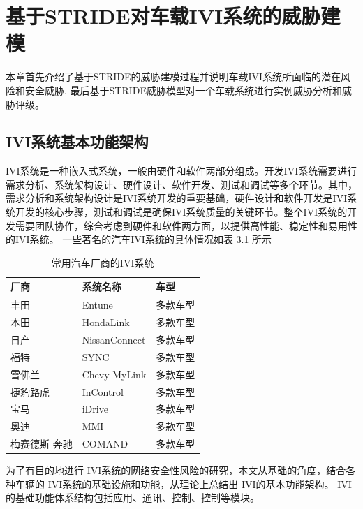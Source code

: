 \chapter{基于STRIDE对车载IVI系统的威胁建模}
\label{ch3}
本章首先介绍了基于STRIDE的威胁建模过程并说明车载IVI系统所面临的潜在风险和安全威胁, 最后基于STRIDE威胁模型对一个车载系统进行实例威胁分析和威胁评级。

\section{IVI系统基本功能架构}
IVI系统是一种嵌入式系统，一般由硬件和软件两部分组成。开发IVI系统需要进行需求分析、系统架构设计、硬件设计、软件开发、测试和调试等多个环节。其中，需求分析和系统架构设计是IVI系统开发的重要基础，硬件设计和软件开发是IVI系统开发的核心步骤，测试和调试是确保IVI系统质量的关键环节。整个IVI系统的开发需要团队协作，综合考虑到硬件和软件两方面，以提供高性能、稳定性和易用性的IVI系统。
一些著名的汽车IVI系统的具体情况如表 3.1 所示
\begin{table}[h]
  \centering
  \begin{tabular}{@{}lll@{}}
      \toprule
      厂商 & 系统名称 & 车型 \\
      \midrule
      丰田 & Entune & 多款车型 \\
      本田 & HondaLink & 多款车型 \\
      日产 & NissanConnect & 多款车型 \\
      福特 & SYNC & 多款车型 \\
      雪佛兰 & Chevy MyLink & 多款车型 \\
      捷豹路虎 & InControl & 多款车型 \\
      宝马 & iDrive & 多款车型 \\
      奥迪 & MMI & 多款车型 \\
      梅赛德斯-奔驰 & COMAND & 多款车型 \\
      \bottomrule
  \end{tabular}
  \caption{常用汽车厂商的IVI系统}
\end{table}
为了有目的地进行 IVI系统的网络安全性风险的研究，本文从基础的角度，结合各种车辆的 IVI系统的基础设施和功能，从理论上总结出 IVI的基本功能架构。
IVI的基础功能体系结构包括应用、通讯、控制、控制等模块。

